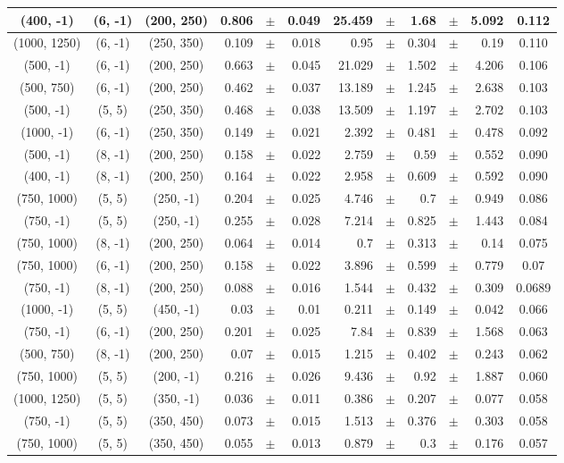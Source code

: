 \documentclass[12pt]{paper}
\begin{document}
\begin{table}[ht]
\begin{center}
{\begin{tabular}{|c|c|c|rrr|rrrrr|c|}
(400, -1)&(6, -1)&(200, 250)&0.806&$\pm$&0.049&25.459&$\pm$&1.68&$\pm$&5.092&0.112\\\hline
(1000, 1250)&(6, -1)&(250, 350)&0.109&$\pm$&0.018&0.95&$\pm$&0.304&$\pm$&0.19&0.110\\\hline
(500, -1)&(6, -1)&(200, 250)&0.663&$\pm$&0.045&21.029&$\pm$&1.502&$\pm$&4.206&0.106\\\hline
(500, 750)&(6, -1)&(200, 250)&0.462&$\pm$&0.037&13.189&$\pm$&1.245&$\pm$&2.638&0.103\\\hline
(500, -1)&(5, 5)&(250, 350)&0.468&$\pm$&0.038&13.509&$\pm$&1.197&$\pm$&2.702&0.103\\\hline
(1000, -1)&(6, -1)&(250, 350)&0.149&$\pm$&0.021&2.392&$\pm$&0.481&$\pm$&0.478&0.092\\\hline
(500, -1)&(8, -1)&(200, 250)&0.158&$\pm$&0.022&2.759&$\pm$&0.59&$\pm$&0.552&0.090\\\hline
(400, -1)&(8, -1)&(200, 250)&0.164&$\pm$&0.022&2.958&$\pm$&0.609&$\pm$&0.592&0.090\\\hline
(750, 1000)&(5, 5)&(250, -1)&0.204&$\pm$&0.025&4.746&$\pm$&0.7&$\pm$&0.949&0.086\\\hline
(750, -1)&(5, 5)&(250, -1)&0.255&$\pm$&0.028&7.214&$\pm$&0.825&$\pm$&1.443&0.084\\\hline
(750, 1000)&(8, -1)&(200, 250)&0.064&$\pm$&0.014&0.7&$\pm$&0.313&$\pm$&0.14&0.075\\\hline
(750, 1000)&(6, -1)&(200, 250)&0.158&$\pm$&0.022&3.896&$\pm$&0.599&$\pm$&0.779&0.07\\\hline
(750, -1)&(8, -1)&(200, 250)&0.088&$\pm$&0.016&1.544&$\pm$&0.432&$\pm$&0.309&0.0689\\\hline
(1000, -1)&(5, 5)&(450, -1)&0.03&$\pm$&0.01&0.211&$\pm$&0.149&$\pm$&0.042&0.066\\\hline
(750, -1)&(6, -1)&(200, 250)&0.201&$\pm$&0.025&7.84&$\pm$&0.839&$\pm$&1.568&0.063\\\hline
(500, 750)&(8, -1)&(200, 250)&0.07&$\pm$&0.015&1.215&$\pm$&0.402&$\pm$&0.243&0.062\\\hline
(750, 1000)&(5, 5)&(200, -1)&0.216&$\pm$&0.026&9.436&$\pm$&0.92&$\pm$&1.887&0.060\\\hline
(1000, 1250)&(5, 5)&(350, -1)&0.036&$\pm$&0.011&0.386&$\pm$&0.207&$\pm$&0.077&0.058\\\hline
(750, -1)&(5, 5)&(350, 450)&0.073&$\pm$&0.015&1.513&$\pm$&0.376&$\pm$&0.303&0.058\\\hline
(750, 1000)&(5, 5)&(350, 450)&0.055&$\pm$&0.013&0.879&$\pm$&0.3&$\pm$&0.176&0.057\\\hline

\end{tabular}}
\end{center}
\end{table}
\end{document}
